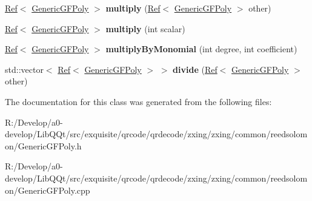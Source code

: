 \begin{DoxyCompactItemize}
\mbox{\hyperlink{classzxing_1_1_ref}{Ref}}$<$ \mbox{\hyperlink{classzxing_1_1_generic_g_f_poly}{Generic\+G\+F\+Poly}} $>$ {\bfseries multiply} (\mbox{\hyperlink{classzxing_1_1_ref}{Ref}}$<$ \mbox{\hyperlink{classzxing_1_1_generic_g_f_poly}{Generic\+G\+F\+Poly}} $>$ other)
\item 
\mbox{\label{classzxing_1_1_generic_g_f_poly_ac8816d94391b52a65a4e89042f0bf566}} 
\mbox{\hyperlink{classzxing_1_1_ref}{Ref}}$<$ \mbox{\hyperlink{classzxing_1_1_generic_g_f_poly}{Generic\+G\+F\+Poly}} $>$ {\bfseries multiply} (int scalar)
\item 
\mbox{\label{classzxing_1_1_generic_g_f_poly_a324a1aaf1f9c0e8f01706eb01c29bc93}} 
\mbox{\hyperlink{classzxing_1_1_ref}{Ref}}$<$ \mbox{\hyperlink{classzxing_1_1_generic_g_f_poly}{Generic\+G\+F\+Poly}} $>$ {\bfseries multiply\+By\+Monomial} (int degree, int coefficient)
\item 
\mbox{\label{classzxing_1_1_generic_g_f_poly_a3cacb5a008c754c2ecfb635bf875f5a1}} 
std\+::vector$<$ \mbox{\hyperlink{classzxing_1_1_ref}{Ref}}$<$ \mbox{\hyperlink{classzxing_1_1_generic_g_f_poly}{Generic\+G\+F\+Poly}} $>$ $>$ {\bfseries divide} (\mbox{\hyperlink{classzxing_1_1_ref}{Ref}}$<$ \mbox{\hyperlink{classzxing_1_1_generic_g_f_poly}{Generic\+G\+F\+Poly}} $>$ other)
\end{DoxyCompactItemize}


The documentation for this class was generated from the following files\+:\begin{DoxyCompactItemize}
\item 
R\+:/\+Develop/a0-\/develop/\+Lib\+Q\+Qt/src/exquisite/qrcode/qrdecode/zxing/zxing/common/reedsolomon/Generic\+G\+F\+Poly.\+h\item 
R\+:/\+Develop/a0-\/develop/\+Lib\+Q\+Qt/src/exquisite/qrcode/qrdecode/zxing/zxing/common/reedsolomon/Generic\+G\+F\+Poly.\+cpp\end{DoxyCompactItemize}
